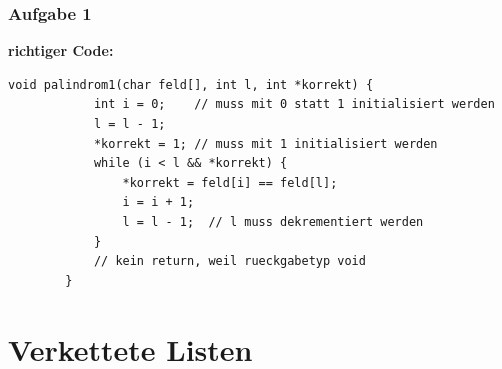 \documentclass{beamer}
\begin{document}
\begin{frame}[fragile] \frametitle{Aufgabe 1}
	\textbf{richtiger Code:} \pause
	\begin{lstlisting}[style=notebook]
		void palindrom1(char feld[], int l, int *korrekt) {
			int i = 0;    // muss mit 0 statt 1 initialisiert werden
			l = l - 1;
			*korrekt = 1; // muss mit 1 initialisiert werden
			while (i < l && *korrekt) {
				*korrekt = feld[i] == feld[l];
				i = i + 1;
				l = l - 1;  // l muss dekrementiert werden
			}
			// kein return, weil rueckgabetyp void
		}
	\end{lstlisting}
\end{frame}

\section{Verkettete Listen}
\end{document}

